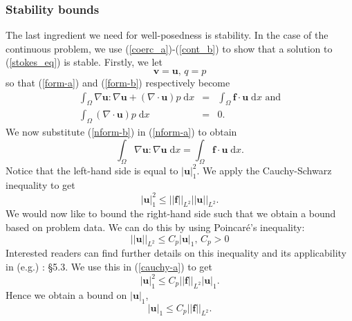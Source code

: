\documentclass[12pt,a4paper]{article}
\theoremstyle{definition}
\begin{document}
\subsubsection{Stability bounds}\label{sec_stability_bounds}
The last ingredient we need for well-posedness is stability.  In the case of the continuous problem, we use (\ref{coerc_a})-(\ref{cont_b}) to show that a solution to (\ref{stokes_eq}) is stable. Firstly, we let 
\begin{equation}
	\textbf{v}=\textbf{u},\, q =p
\end{equation}
so that (\ref{form-a}) and (\ref{form-b}) respectively become
\begin{eqnarray}\label{nform-a}
\int_{\Omega}\nabla \textbf{u} : \nabla \textbf{u}+\left(\nabla \cdot \textbf{u}\right)p\;\mathrm{d}x  &=&\int_{\Omega}\textbf{f}\cdot \textbf{u} \;\mathrm{d}x
 \text{ and} \\\label{nform-b}
\int_{\Omega}\left(\nabla \cdot \textbf{u}\right)p\;\mathrm{d}x&=& 0.
\end{eqnarray}
We now substitute (\ref{nform-b}) in (\ref{nform-a}) to obtain
\begin{equation}
\int_{\Omega}\nabla \textbf{u} : \nabla \textbf{u}\;\mathrm{d}x  =\int_{\Omega}\textbf{f}\cdot \textbf{u} \;\mathrm{d}x.
\end{equation}
Notice that the left-hand side is equal to $\left|\textbf{u}\right|_1^2$.  We apply the Cauchy-Schwarz inequality to get
\begin{equation}\label{cauchy-a}
\left|\textbf{u}\right|_1^2\leq\left|\left|\textbf{f}\right|\right|_{L^2}\left|\left|\textbf{u}\right|\right|_{L^2}.
\end{equation}
We would now like to bound the right-hand side such that we obtain a bound based on problem data.  We can do this by using Poincar\'e's inequality:
\begin{equation} 
\left|\left|\textbf{u}\right|\right|_{L^2}\leq C_p\left|\textbf{u}\right|_1\text{, } C_p>0
\end{equation}
Interested readers can find further details on this inequality and its applicability  in (e.g.) \cite{brenner2007mathematical}: \S 5.3.  We use this in (\ref{cauchy-a}) to get
\begin{equation}\label{cauchy-b}
\left|\textbf{u}\right|_1^2\leq C_p\left|\left|\textbf{f}\right|\right|_{L^2} \left|\textbf{u}\right|_1.
\end{equation}
Hence we obtain a bound on $\left|\textbf{u}\right|_1$, 
\begin{equation}\label{bound-u-cont}
\left|\textbf{u}\right|_1\leq C_p\left|\left|\textbf{f}\right|\right|_{L^2}.
\end{equation}
\end{document}
